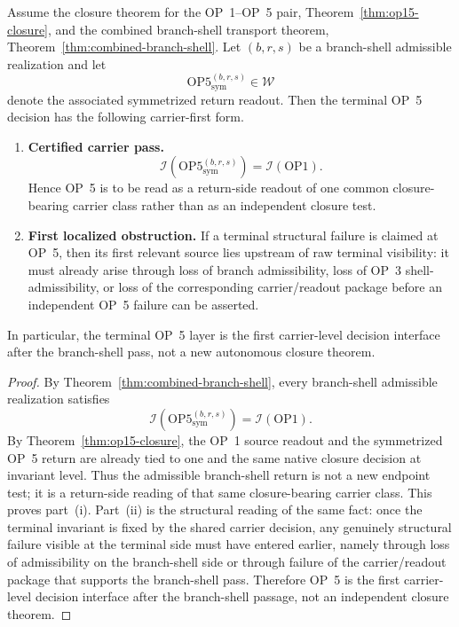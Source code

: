 \begin{proposition}
\label{prop:carrier-first-op5-interface}
Assume the closure theorem for the OP~1--OP~5 pair, Theorem~\ref{thm:op15-closure}, and the combined branch-shell transport theorem, Theorem~\ref{thm:combined-branch-shell}. Let $(b,r,s)$ be a branch-shell admissible realization and let
\[
\mathrm{OP5}^{(b,r,s)}_{\mathrm{sym}}\in\mathcal{W}
\]
denote the associated symmetrized return readout. Then the terminal OP~5 decision has the following carrier-first form.
\begin{enumerate}[leftmargin=2em,label=(\roman*)]
\item \textbf{Certified carrier pass.}
\[
\mathcal{I}\!\left(\mathrm{OP5}^{(b,r,s)}_{\mathrm{sym}}\right)
=
\mathcal{I}(\mathrm{OP1}).
\]
Hence OP~5 is to be read as a return-side readout of one common closure-bearing carrier class rather than as an independent closure test.
\item \textbf{First localized obstruction.} If a terminal structural failure is claimed at OP~5, then its first relevant source lies upstream of raw terminal visibility: it must already arise through loss of branch admissibility, loss of OP~3 shell-admissibility, or loss of the corresponding carrier/readout package before an independent OP~5 failure can be asserted.
\end{enumerate}
In particular, the terminal OP~5 layer is the first carrier-level decision interface after the branch-shell pass, not a new autonomous closure theorem.
\end{proposition}

\begin{proof}
By Theorem~\ref{thm:combined-branch-shell}, every branch-shell admissible realization satisfies
\[
\mathcal{I}\!\left(\mathrm{OP5}^{(b,r,s)}_{\mathrm{sym}}\right)=\mathcal{I}(\mathrm{OP1}).
\]
By Theorem~\ref{thm:op15-closure}, the OP~1 source readout and the symmetrized OP~5 return are already tied to one and the same native closure decision at invariant level. Thus the admissible branch-shell return is not a new endpoint test; it is a return-side reading of that same closure-bearing carrier class. This proves part~(i). Part~(ii) is the structural reading of the same fact: once the terminal invariant is fixed by the shared carrier decision, any genuinely structural failure visible at the terminal side must have entered earlier, namely through loss of admissibility on the branch-shell side or through failure of the carrier/readout package that supports the branch-shell pass. Therefore OP~5 is the first carrier-level decision interface after the branch-shell passage, not an independent closure theorem.
\end{proof}

